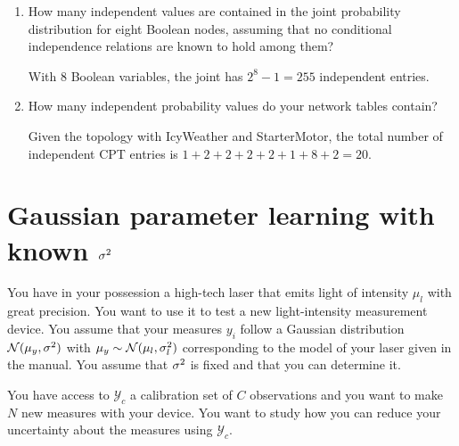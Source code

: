 \documentclass[11pt, a4paper]{article}
\begin{document}
\begin{enumerate}
    \item How many independent values are contained in the joint probability distribution for eight Boolean nodes, assuming that no conditional independence relations are known to hold among them?

    \begin{solution}
        With 8 Boolean variables, the joint has $2^8 - 1 = 255$ independent entries.
    \end{solution}

    \item How many independent probability values do your network tables contain?

    \begin{solution}
        Given the topology with IcyWeather and StarterMotor, the total number of independent CPT entries is $1 + 2 + 2 + 2 + 2 + 1 + 8 + 2 = 20$.
    \end{solution}
\end{enumerate}

\newpage

\section{Gaussian parameter learning with known $\text{$\sigma^2$}$}
You have in your possession a high-tech laser that emits light of intensity $\mu_l$ with great precision. You want to use it to test a new light-intensity measurement device. You assume that your measures $y_i$ follow a Gaussian distribution $\mathcal{N}(\mu_y,\text{$\sigma^2$})$ with $\mu_y \sim \mathcal{N}(\mu_l, \sigma_l^2)$ corresponding to the model of your laser given in the manual. You assume that $\text{$\sigma^2$}$ is fixed and that you can determine it.

You have access to $\mathcal{Y}_c$ a calibration set of $C$ observations and you want to make $N$ new measures with your device. You want to study how you can reduce your uncertainty about the measures using $\mathcal{Y}_c$.
\end{document}
